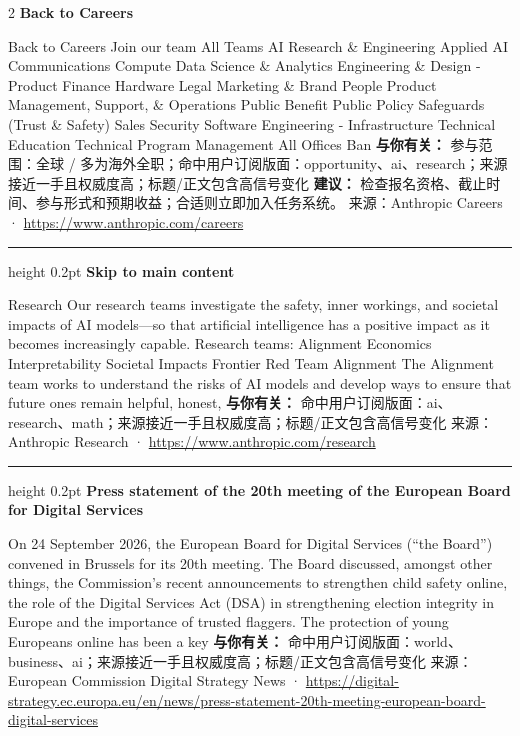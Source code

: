 \documentclass[10.5pt]{ctexart}
\begin{document}
\begin{multicols}{2}
{\large\bfseries Back to Careers}\par
Back to Careers Join our team All Teams AI Research \& Engineering Applied AI Communications Compute Data Science \& Analytics Engineering \& Design - Product Finance Hardware Legal Marketing \& Brand People Product Management, Support, \& Operations Public Benefit Public Policy Safeguards (Trust \& Safety) Sales Security Software Engineering - Infrastructure Technical Education Technical Program Management All Offices Ban
\textbf{与你有关：} 参与范围：全球 / 多为海外全职；命中用户订阅版面：opportunity、ai、research；来源接近一手且权威度高；标题/正文包含高信号变化
\textbf{建议：} 检查报名资格、截止时间、参与形式和预期收益；合适则立即加入任务系统。
{\footnotesize\color{ormuted} 来源：Anthropic Careers · \url{https://www.anthropic.com/careers}}
\vspace{2mm}
\hrule height 0.2pt
\vspace{2mm}
{\large\bfseries Skip to main content}\par
Research Our research teams investigate the safety, inner workings, and societal impacts of AI models—so that artificial intelligence has a positive impact as it becomes increasingly capable. Research teams: Alignment Economics Interpretability Societal Impacts Frontier Red Team Alignment The Alignment team works to understand the risks of AI models and develop ways to ensure that future ones remain helpful, honest, 
\textbf{与你有关：} 命中用户订阅版面：ai、research、math；来源接近一手且权威度高；标题/正文包含高信号变化
{\footnotesize\color{ormuted} 来源：Anthropic Research · \url{https://www.anthropic.com/research}}
\vspace{2mm}
\hrule height 0.2pt
\vspace{2mm}
{\large\bfseries Press statement of the 20th meeting of the European Board for Digital Services}\par
On 24 September 2026, the European Board for Digital Services (“the Board”) convened in Brussels for its 20th meeting. The Board discussed, amongst other things, the Commission’s recent announcements to strengthen child safety online, the role of the Digital Services Act (DSA) in strengthening election integrity in Europe and the importance of trusted flaggers. The protection of young Europeans online has been a key 
\textbf{与你有关：} 命中用户订阅版面：world、business、ai；来源接近一手且权威度高；标题/正文包含高信号变化
{\footnotesize\color{ormuted} 来源：European Commission Digital Strategy News · \url{https://digital-strategy.ec.europa.eu/en/news/press-statement-20th-meeting-european-board-digital-services}}

\end{multicols}
\end{document}
